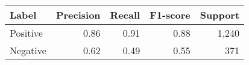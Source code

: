 \begin{tabular}{lrrrr}
\midrule
\textbf{Label}      & \textbf{Precision} & \textbf{Recall}  & \textbf{F1-score}    & \textbf{Support}    \\
\midrule
Positive            & 0.86               & 0.91             & 0.88                  & 1,240        \\
Negative            & 0.62               & 0.49             & 0.55                  & 371        \\
\midrule
\end{tabular}


